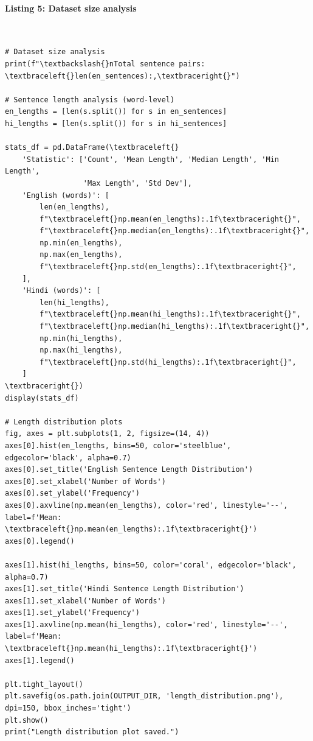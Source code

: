 \documentclass[12pt,a4paper,oneside]{report}
\begin{document}
\paragraph{Listing 5: Dataset size analysis}\mbox{}\\[-1ex]
\begin{Verbatim}[commandchars=\\\{\},breaklines=true,breakanywhere=true,fontsize=\scriptsize,frame=leftline,framesep=2mm,rulecolor=\color{gray}]
# Dataset size analysis
print(f"\textbackslash{}nTotal sentence pairs: \textbraceleft{}len(en_sentences):,\textbraceright{}")

# Sentence length analysis (word-level)
en_lengths = [len(s.split()) for s in en_sentences]
hi_lengths = [len(s.split()) for s in hi_sentences]

stats_df = pd.DataFrame(\textbraceleft{}
    'Statistic': ['Count', 'Mean Length', 'Median Length', 'Min Length',
                  'Max Length', 'Std Dev'],
    'English (words)': [
        len(en_lengths),
        f"\textbraceleft{}np.mean(en_lengths):.1f\textbraceright{}",
        f"\textbraceleft{}np.median(en_lengths):.1f\textbraceright{}",
        np.min(en_lengths),
        np.max(en_lengths),
        f"\textbraceleft{}np.std(en_lengths):.1f\textbraceright{}",
    ],
    'Hindi (words)': [
        len(hi_lengths),
        f"\textbraceleft{}np.mean(hi_lengths):.1f\textbraceright{}",
        f"\textbraceleft{}np.median(hi_lengths):.1f\textbraceright{}",
        np.min(hi_lengths),
        np.max(hi_lengths),
        f"\textbraceleft{}np.std(hi_lengths):.1f\textbraceright{}",
    ]
\textbraceright{})
display(stats_df)

# Length distribution plots
fig, axes = plt.subplots(1, 2, figsize=(14, 4))
axes[0].hist(en_lengths, bins=50, color='steelblue', edgecolor='black', alpha=0.7)
axes[0].set_title('English Sentence Length Distribution')
axes[0].set_xlabel('Number of Words')
axes[0].set_ylabel('Frequency')
axes[0].axvline(np.mean(en_lengths), color='red', linestyle='--', label=f'Mean: \textbraceleft{}np.mean(en_lengths):.1f\textbraceright{}')
axes[0].legend()

axes[1].hist(hi_lengths, bins=50, color='coral', edgecolor='black', alpha=0.7)
axes[1].set_title('Hindi Sentence Length Distribution')
axes[1].set_xlabel('Number of Words')
axes[1].set_ylabel('Frequency')
axes[1].axvline(np.mean(hi_lengths), color='red', linestyle='--', label=f'Mean: \textbraceleft{}np.mean(hi_lengths):.1f\textbraceright{}')
axes[1].legend()

plt.tight_layout()
plt.savefig(os.path.join(OUTPUT_DIR, 'length_distribution.png'), dpi=150, bbox_inches='tight')
plt.show()
print("Length distribution plot saved.")
\end{Verbatim}
\end{document}
